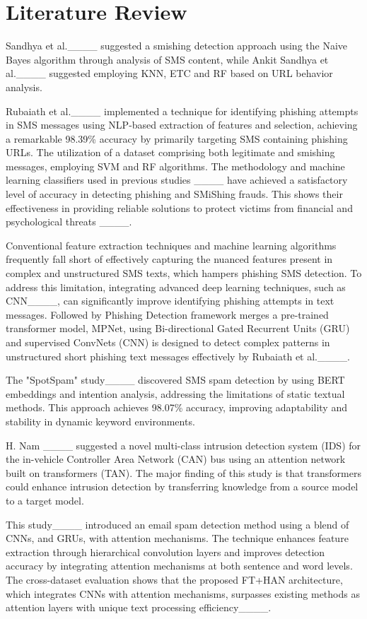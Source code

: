 \section{Literature Review}
Sandhya et al.____ suggested a smishing detection approach using the Naive Bayes algorithm through analysis of SMS content, while Ankit Sandhya et al.____ suggested employing KNN, ETC and RF based on URL behavior analysis. 

Rubaiath et al.____ implemented a technique for identifying phishing attempts in SMS messages using NLP-based extraction of features and selection, achieving a remarkable 98.39\% accuracy by primarily targeting SMS containing phishing URLs. The utilization of a dataset comprising both legitimate and smishing messages, employing SVM and RF algorithms. The methodology and machine learning classifiers used in previous studies ____ have achieved a satisfactory level of accuracy in detecting phishing and SMiShing frauds. This shows their effectiveness in providing reliable solutions to protect victims from financial and psychological threats ____.

Conventional feature extraction techniques and machine learning algorithms frequently fall short of effectively capturing the nuanced features present in complex and unstructured SMS texts, which hampers phishing SMS detection. To address this limitation, integrating advanced deep learning techniques, such as CNN____, can significantly improve identifying phishing attempts in text messages. Followed by Phishing Detection framework merges a pre-trained transformer model, MPNet, using Bi-directional Gated Recurrent Units (GRU) and supervised ConvNets (CNN) is designed to detect complex patterns in unstructured short phishing text messages effectively by Rubaiath et al.____.

The "SpotSpam" study____ discovered SMS spam detection by using BERT embeddings and intention analysis, addressing the limitations of static textual methods. This approach achieves 98.07\% accuracy, improving adaptability and stability in dynamic keyword environments.

H. Nam ____ suggested a novel multi-class intrusion detection system (IDS) for the in-vehicle Controller Area Network (CAN) bus using an attention network built on transformers (TAN). The major finding of this study is that transformers could enhance intrusion detection by transferring knowledge from a source model to a target model.

This study____ introduced an email spam detection method using a blend of CNNs, and GRUs, with attention mechanisms. The technique enhances feature extraction through hierarchical convolution layers and improves detection accuracy by integrating attention mechanisms at both sentence and word levels. The cross-dataset evaluation shows that the proposed FT+HAN architecture, which integrates CNNs with attention mechanisms, surpasses existing methods as attention layers with unique text processing efficiency____.